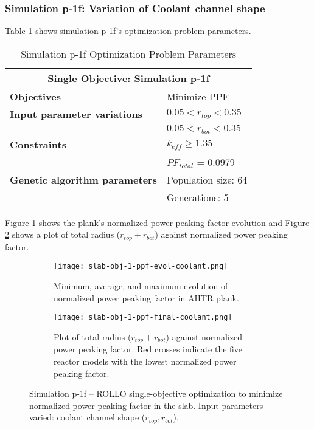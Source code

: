 \subsubsection{Simulation p-1f: Variation of Coolant channel shape}
Table \ref{tab:simulationp1f} shows simulation p-1f's optimization problem parameters. 
\begin{table}[htbp!]
    \centering
    \onehalfspacing
    \caption{Simulation p-1f Optimization Problem Parameters}
	\label{tab:simulationp1f}
    \footnotesize
    \begin{tabular}{l|p{3cm}}
    \hline 
    \multicolumn{2}{c}{\textbf{Single Objective: Simulation p-1f}} \\
    \hline 
    \textbf{Objectives} & Minimize PPF \\
    \hline 
    \textbf{Input parameter variations} & $0.05<r_{top}<0.35$ \\
    & $0.05<r_{bot}<0.35$ \\
    \hline
    \textbf{Constraints} & $k_{eff} \geq 1.35$\\ 
    & $PF_{total}$ = 0.0979\\
    \hline 
    \textbf{Genetic algorithm parameters} & Population size: 64 \\
    & Generations: 5 \\
    \hline
    \end{tabular}
\end{table}

Figure \ref{fig:slab-obj-1-ppf-evol-coolant} shows the plank's normalized power peaking 
factor evolution and Figure \ref{fig:slab-obj-1-ppf-final-coolant} shows a plot of total 
radius ($r_{top} + r_{bot}$) against normalized power peaking factor. 
\begin{figure}[htbp!]
    \centering
    \begin{subfigure}{\textwidth}
        \texttt{[image: slab-obj-1-ppf-evol-coolant.png]}
        \caption{Minimum, average, and maximum evolution of normalized power 
        peaking factor in AHTR plank.}
        \label{fig:slab-obj-1-ppf-evol-coolant} 
    \end{subfigure}
    \begin{subfigure}{\textwidth}
        \texttt{[image: slab-obj-1-ppf-final-coolant.png]}
        \caption{Plot of total radius ($r_{top} + r_{bot}$) against normalized 
        power peaking factor. Red crosses indicate the five reactor models with the 
        lowest normalized power peaking factor.}
        \label{fig:slab-obj-1-ppf-final-coolant} 
    \end{subfigure}
    \caption{Simulation p-1f -- ROLLO single-objective optimization to minimize normalized power 
    peaking factor in the slab. Input parameters varied: coolant channel shape 
    ($r_{top}, r_{bot}$).}
    \label{fig:slab-obj-1-ppf-coolant}
\end{figure}

